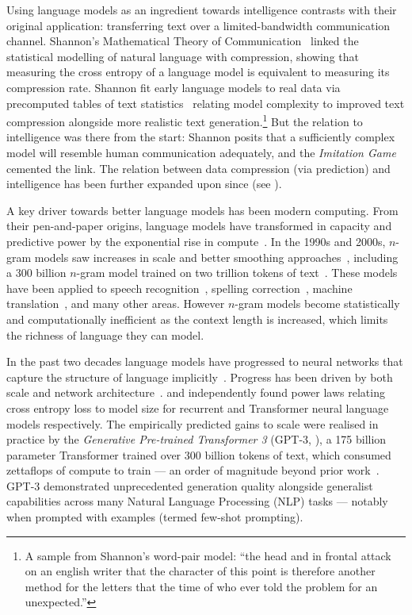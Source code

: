 Using language models as an ingredient towards intelligence contrasts with their original application: transferring text over a limited-bandwidth communication channel. Shannon's Mathematical Theory of Communication~\citep{shannon1948mathematical} linked the statistical modelling of natural language with compression, showing that measuring the cross entropy of a language model is equivalent to measuring its compression rate. Shannon fit early language models to real data via precomputed tables of text statistics~\citep{dewey1923relativ} relating model complexity to improved text compression alongside more realistic text generation.\footnote{A sample from Shannon's word-pair model: ``the head and in frontal attack on an english writer that the character of this point is therefore another method for the letters that the time of who ever told the problem for an unexpected.''}  But the relation to intelligence was there from the start: Shannon posits that a sufficiently complex model will resemble human communication adequately, and the \textit{Imitation Game}~\citep{turing1950computing} cemented the link. The relation between data compression (via prediction) and intelligence has been further expanded upon since (see \citet{wolff1982language, chater1999search, legg2007universal}).

A key driver towards better language models has been modern computing. From their pen-and-paper origins, language models have transformed in capacity and predictive power by the exponential rise in compute~\citep{moore1965cramming}. In the 1990s and 2000s, $n$-gram models saw increases in scale and better smoothing approaches~\citep{ney1994structuring}, including a 300 billion $n$-gram model trained on two trillion tokens of text~\citep{brants2007large}.  These models have been applied to speech recognition~\citep{jelinek1997statistical}, spelling correction~\citep{brill2000improved}, machine translation~\citep{brown1990statistical}, and many other areas. However $n$-gram models become statistically and computationally inefficient as the context length is increased, which limits the richness of language they can model.

In the past two decades language models have progressed to neural networks that capture the structure of language implicitly~\citep{bengio2003neural, mikolov2010recurrent, graves2013generating, jozefowicz2016exploring, radford2019language}. Progress has been driven by both scale and network architecture~\citep{hochreiter1997long,bahdanau2014neural,vaswani2017attention}.
\citet{rosenfeld2020a} and \citet{kaplan2020scaling} independently found power laws relating cross entropy loss to model size for recurrent and Transformer neural language models respectively.  The empirically predicted gains to scale were realised in practice by the \textit{Generative Pre-trained Transformer 3} (GPT-3, \citet{gpt3}), a 175 billion parameter Transformer trained over 300 billion tokens of text, which consumed zettaflops of compute to train --- an order of magnitude beyond prior work~\citep{rosset2020turing}. GPT-3 demonstrated unprecedented generation quality alongside generalist capabilities across many Natural Language Processing (NLP) tasks --- notably when prompted with examples (termed few-shot prompting).

